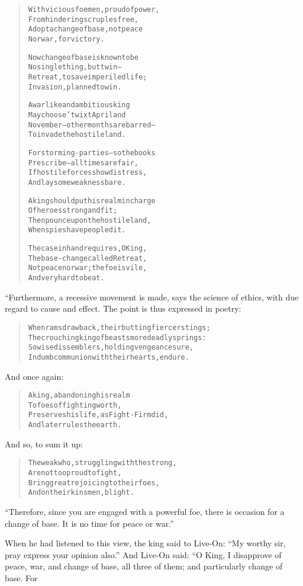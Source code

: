 \documentclass[article, twoside, 14pt]{memoir}
\renewenvironment{verbatim}{%
\begin{quote}%
\vskip -10pt%
\begin{alltt}\normalfont\large}{\end{alltt}%
\end{quote}%
\vskip -10pt
} %
\begin{document}
\begin{verbatim}
With vicious foemen, proud of power,
    From hindering scruples free,
Adopt a change of base, not peace
    Nor war, for victory.

Now change of base is known to be
    No single thing, but twin--
Retreat, to save imperiled life;
    Invasion, planned to win.

A warlike and ambitious king
    May choose 'twixt April and
November--other months are barred--
    To invade the hostile land.

For storming-parties--so the books
    Prescribe--all times are fair,
If hostile forces show distress,
    And lay some weakness bare.

A king should put his realm in charge
    Of heroes strong and fit;
Then pounce upon the hostile land,
    When spies have peopled it.

The case in hand requires, O King,
    The base-change called Retreat,
Not peace nor war; the foe is vile,
    And very hard to beat.
\end{verbatim}
“Furthermore, a recessive movement is made, says the science of
ethics, with due regard to cause and effect. The point is thus
expressed in poetry:

\begin{verbatim}
When rams draw back, their butting fiercer stings;
The crouching king of beasts more deadly springs:
So wise dissemblers, holding vengeance sure,
In dumb communion with their hearts, endure.
\end{verbatim}
And once again:

\begin{verbatim}
A king, abandoning his realm
    To foes of fighting worth,
Preserves his life, as Fight-Firm did,
    And later rules the earth.
\end{verbatim}
And so, to sum it up:

\begin{verbatim}
The weak who, struggling with the strong,
    Are not too proud to fight,
Bring great rejoicing to their foes,
    And on their kinsmen, blight.
\end{verbatim}
``Therefore, since you are engaged with a powerful foe, there is occasion for a change of base. It is no time for peace or war.''

When he had listened to this view, the king said to Live-On:
``My worthy sir, pray express your opinion also.'' And Live-On
said: “O King, I disapprove of peace, war, and change of base, all
three of them; and particularly change of base. For
\end{document}
